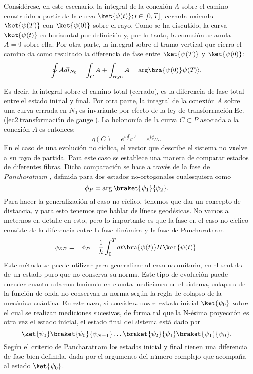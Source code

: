 Considérese, en este escenario, la integral de la conexión \( A \) sobre el camino construido a partir de la curva \( \ket{\psi(t)} ; t \in [0, T] \), cerrada uniendo \( \ket{\psi(T)} \) con \( \ket{\psi(0)} \) sobre el rayo. Como se ha discutido, la curva \( \ket{\psi(t)} \) es horizontal por definición y, por lo tanto, la conexión se anula \( A = 0 \) sobre ella. Por otra parte, la integral sobre el tramo vertical que cierra el camino da como resultado la diferencia de fase entre \( \ket{\psi(T)} \) y \( \ket{\psi(0)} \):
\begin{equation}
\oint A dl_{N_0} = \int_C A + \int_{\text{rayo}} A = \text{arg} \bra{\psi(0)} \psi(T) \rangle.
\end{equation}

Es decir, la integral sobre el camino total (cerrado), es la diferencia de fase total entre el estado inicial y final. Por otra parte, la integral de la conexión \( A \) sobre una curva cerrada en \( N_0 \) es invariante por efecto de la ley de transformación Ec. (\ref{ec2:transformación de gauge}). La holonomía de la curva \( C \subset P \) asociada a la conexión \( A \) es entonces:
\begin{equation}
g(C) = e^{i \oint_C A} = e^{i\phi_{\text{AA}}}.
\end{equation}
En el caso de una evolución no cíclica, el vector que describe el sistema no vuelve a su rayo de partida. Para este caso se establece una manera de comparar estados de diferentes fibras. Dicha comparación se hace a través de la fase de \textit{Pancharatnam} \cite{Pancha1956}, definida para dos estados no-ortogonales cualesquiera como
\begin{equation}
    \phi_P = \arg \braket{\psi_1}{\psi_2}.
\end{equation}
Para hacer la generalización al caso no-cíclico, tenemos que dar un concepto de distancia, y para esto tenemos que hablar de líneas geodésicas. No vamos a meternos en detalle en esto, pero lo importante es que la fase en el caso no cíclico consiste de la diferencia entre la fase dinámica y la fase de Pancharatnam
\begin{equation}
    \phi_{SB}=-\phi_P-\frac{1}{\hbar}\int_0^Tdt\bra{\psi(t)}H\ket{\psi(t)}.
\end{equation}
Este método se puede utilizar para generalizar al caso no unitario, en el sentido de un estado puro que no conserva su norma. Este tipo de evolución puede suceder cuanto estamos teniendo en cuenta mediciones en el sistema, colapsos de la función de onda no conservan la norma según la regla de colapso de la mecánica cuántica. En este caso, si consideramos el estado inicial $\ket{\psi_0}$ sobre el cual se realizan mediciones sucesivas, de forma tal que la N-ésima proyección es otra vez el estado inicial, el estado final del sistema está dado por
\begin{equation}
    \ket{\psi_0}\braket{\psi_0}{\psi_{N-1}}\dots\braket{\psi_2}{\psi_1}\braket{\psi_1}{\psi_0}.
\end{equation}
Según el criterio de Pancharatnam los estados inicial y final tienen una diferencia de fase bien definida, dada por el argumento del número complejo que acompaña al estado $\ket{\psi_0}$.


